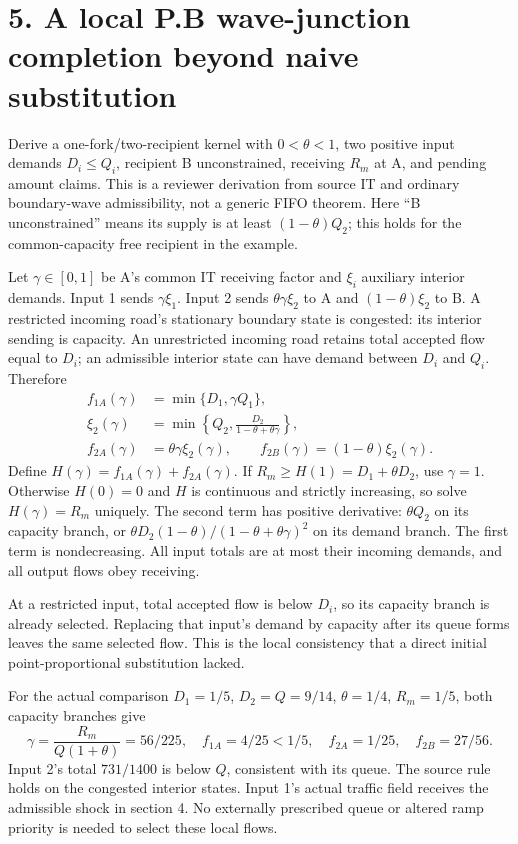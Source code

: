 \documentclass[11pt,a4paper]{article}
\begin{document}
\newpage
\section*{5. A local P.B wave-junction completion beyond naive substitution}
Derive a one-fork/two-recipient kernel with $0<\theta<1$, two positive input
demands $D_i\le Q_i$, recipient B unconstrained, receiving $R_m$ at A,
and pending amount claims. This is a reviewer derivation from source IT and
ordinary boundary-wave admissibility, not a generic FIFO theorem.
Here ``B unconstrained'' means its supply is at least $(1-\theta)Q_2$;
this holds for the common-capacity free recipient in the example.

Let $\gamma\in[0,1]$ be A's common IT receiving factor and $\xi_i$ auxiliary
interior demands. Input 1 sends $\gamma\xi_1$. Input 2 sends
$\theta\gamma\xi_2$ to A and $(1-\theta)\xi_2$ to B. A restricted incoming
road's stationary boundary state is congested: its interior sending is capacity.
An unrestricted incoming road retains total accepted flow equal to $D_i$;
an admissible interior state can have demand between $D_i$ and $Q_i$.
Therefore
\begin{align}
 f_{1A}(\gamma)&=\min\{D_1,\gamma Q_1\},\\
 \xi_2(\gamma)&=\min\left\{Q_2,\frac{D_2}{1-\theta+\theta\gamma}\right\},\\
 f_{2A}(\gamma)&=\theta\gamma\xi_2(\gamma),\qquad
 f_{2B}(\gamma)=(1-\theta)\xi_2(\gamma).
\end{align}
Define $H(\gamma)=f_{1A}(\gamma)+f_{2A}(\gamma)$. If
$R_m\ge H(1)=D_1+\theta D_2$, use $\gamma=1$. Otherwise $H(0)=0$ and
$H$ is continuous and strictly increasing, so solve $H(\gamma)=R_m$ uniquely.
The second term has positive derivative: $\theta Q_2$ on its capacity branch,
or $\theta D_2(1-\theta)/(1-\theta+\theta\gamma)^2$ on its demand branch.
The first term is nondecreasing. All input totals are at most their incoming
demands, and all output flows obey receiving.

At a restricted input, total accepted flow is below $D_i$, so its capacity
branch is already selected. Replacing that input's demand by capacity after
its queue forms leaves the same selected flow. This is the local consistency
that a direct initial point-proportional substitution lacked.

For the actual comparison $D_1=1/5$, $D_2=Q=9/14$, $\theta=1/4$,
$R_m=1/5$, both capacity branches give
\begin{equation}
 \gamma=\frac{R_m}{Q(1+\theta)}=56/225,\quad
 f_{1A}=4/25<1/5,\quad f_{2A}=1/25,\quad f_{2B}=27/56.
\end{equation}
Input 2's total $731/1400$ is below $Q$, consistent with its queue. The source
rule holds on the congested interior states. Input 1's actual traffic field
receives the admissible shock in section 4. No externally prescribed queue
or altered ramp priority is needed to select these local flows.
\end{document}

